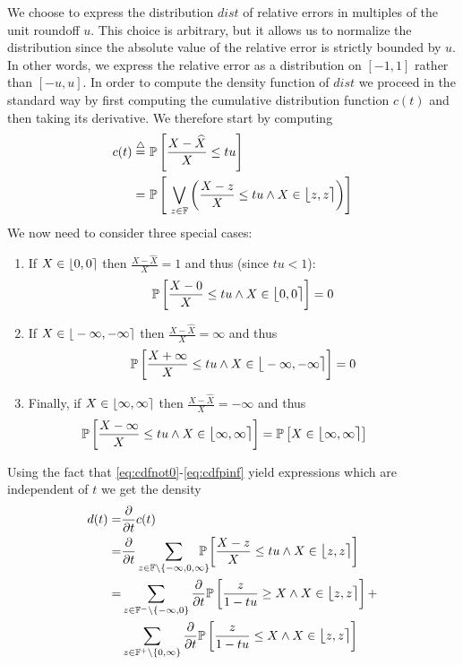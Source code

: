 \documentclass[10pt,conference]{IEEEtran}
\newcommand{\Pro}[1]{\mathbb{P}\left[ #1 \right]}
\newcommand{\fintvl}[1][x]{\mathlarger{\lfloor}#1,#1\mathlarger{\rceil}}
\newcommand{\F}{\mathbb{F}}
\newcommand{\dt}{\frac{\partial}{\partial t}}
\begin{document}
We choose to express the distribution $dist$ of relative errors in multiples of the unit roundoff $u$. This choice is arbitrary, but it allows us to normalize the distribution since the absolute value of the relative error is strictly bounded by $u$. In other words, we express the relative error as a distribution on $[-1,1]$ rather than $[-u,u]$. In order to compute the density function of $dist$ we proceed in the standard way by first computing the cumulative distribution function $c(t)$ and then taking its derivative. We therefore start by computing
\begin{align*}
c(t)\stackrel{\triangle}{=}&~\Pro{\frac{X-\widehat{X}}{X}\leq tu}\\
=&~\Pro{~\bigvee_{z\in\F}\left(\frac{X-z}{X}\leq tu\wedge X\in \fintvl[z]\right)}
\end{align*}
We now need to consider three special cases:
\begin{enumerate}
\item If $X\in \fintvl[0]$ then $\frac{X-\widehat{X}}{X}=1$ and thus (since $tu<1$):
\begin{align}\label{eq:cdfnot0}
\Pro{\frac{X-0}{X}\leq tu\wedge X\in \fintvl[0]}=0
\end{align}
\item If $X\in \fintvl[-\infty]$ then $\frac{X-\widehat{X}}{X}=\infty$ and thus 
\begin{align}\label{eq:cdfnotminf}
\Pro{\frac{X+\infty}{X}\leq tu\wedge X\in \fintvl[-\infty]}=0
\end{align}
\item Finally, if $X\in \fintvl[\infty]$ then $\frac{X-\widehat{X}}{X}=-\infty$ and thus 
\begin{align}\label{eq:cdfpinf}
\hspace{-3em}\Pro{\frac{X-\infty}{X}\leq tu\wedge X\in \fintvl[\infty]}=\Pro{X\in \fintvl[\infty]}
\end{align}
\end{enumerate}
Using the fact that \eqref{eq:cdfnot0}-\eqref{eq:cdfpinf} yield expressions which are independent of $t$ we get the density
\begin{align*}
d(t)=&\dt c(t)\\
=&\dt\sum_{z\in\F\setminus\{-\infty,0,\infty\}}\hspace{-1em}\Pro{\frac{X-z}{X}\leq tu\wedge X\in \fintvl[z]}\\
=& \sum_{z\in\F^-\setminus\{-\infty,0\}}\dt\Pro{\frac{z}{1-tu}\geq X\wedge X\in \fintvl[z]}+\\
&\sum_{z\in\F^+\setminus\{0,\infty\}}\dt\Pro{\frac{z}{1-tu}\leq X \wedge X\in \fintvl[z]}
\end{align*}
\end{document}
